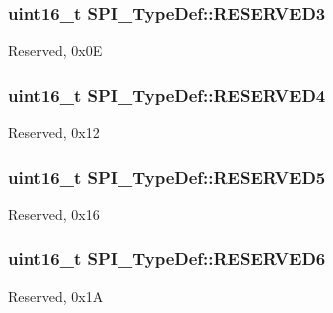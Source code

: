 \subsubsection[{\texorpdfstring{R\+E\+S\+E\+R\+V\+E\+D3}{RESERVED3}}]{\setlength{\rightskip}{0pt plus 5cm}uint16\+\_\+t S\+P\+I\+\_\+\+Type\+Def\+::\+R\+E\+S\+E\+R\+V\+E\+D3}\hypertarget{struct_s_p_i___type_def_aeb1d1d561f1d51232369197fa7acb53a}{}\label{struct_s_p_i___type_def_aeb1d1d561f1d51232369197fa7acb53a}
Reserved, 0x0E 
\subsubsection[{\texorpdfstring{R\+E\+S\+E\+R\+V\+E\+D4}{RESERVED4}}]{\setlength{\rightskip}{0pt plus 5cm}uint16\+\_\+t S\+P\+I\+\_\+\+Type\+Def\+::\+R\+E\+S\+E\+R\+V\+E\+D4}\hypertarget{struct_s_p_i___type_def_a20e3ac1445ed1e7a9792ca492c46a73a}{}\label{struct_s_p_i___type_def_a20e3ac1445ed1e7a9792ca492c46a73a}
Reserved, 0x12 
\subsubsection[{\texorpdfstring{R\+E\+S\+E\+R\+V\+E\+D5}{RESERVED5}}]{\setlength{\rightskip}{0pt plus 5cm}uint16\+\_\+t S\+P\+I\+\_\+\+Type\+Def\+::\+R\+E\+S\+E\+R\+V\+E\+D5}\hypertarget{struct_s_p_i___type_def_ab63440e38c7872a8ed11fb2d8d94714e}{}\label{struct_s_p_i___type_def_ab63440e38c7872a8ed11fb2d8d94714e}
Reserved, 0x16 
\subsubsection[{\texorpdfstring{R\+E\+S\+E\+R\+V\+E\+D6}{RESERVED6}}]{\setlength{\rightskip}{0pt plus 5cm}uint16\+\_\+t S\+P\+I\+\_\+\+Type\+Def\+::\+R\+E\+S\+E\+R\+V\+E\+D6}\hypertarget{struct_s_p_i___type_def_a0870177921541602a44f744f1b66e823}{}\label{struct_s_p_i___type_def_a0870177921541602a44f744f1b66e823}
Reserved, 0x1A 
